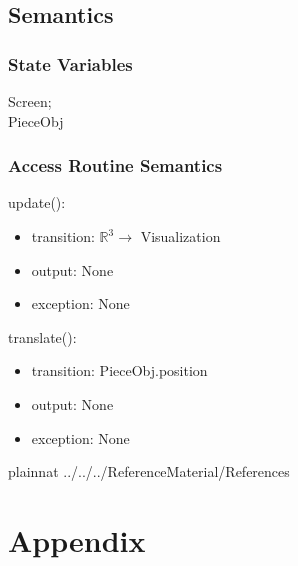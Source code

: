\documentclass[12pt, titlepage]{article}
\begin{document}
\subsection{Semantics}

\subsubsection{State Variables}

Screen;\\
PieceObj
\subsubsection{Access Routine Semantics}

\noindent update():
\begin{itemize}
	\item transition: $\mathbb{R}^{3} \rightarrow$ Visualization 
	\item output: None 
	\item exception: None  
\end{itemize}

\noindent translate():
\begin{itemize}
	\item transition: PieceObj.position
	\item output: None 
	\item exception: None  
\end{itemize}

\newpage

 {plainnat}
 {../../../ReferenceMaterial/References}

\newpage

\section{Appendix} \label{Appendix}

\end{document}
